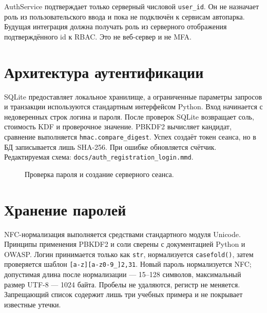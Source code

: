 \documentclass[12pt,a4paper]{article}
\begin{document}
AuthService подтверждает только серверный числовой \texttt{user\_id}. Он не назначает роль из пользовательского ввода и пока не подключён к сервисам автопарка. Будущая интеграция должна получать роль из серверного отображения подтверждённого id к RBAC. Это не веб-сервер и не MFA.

\section{Архитектура аутентификации}
SQLite предоставляет локальное хранилище, а ограниченные параметры запросов и транзакции используются стандартным интерфейсом Python. \cite{sqlite}
Вход начинается с недоверенных строк логина и пароля. После проверок SQLite возвращает соль, стоимость KDF и проверочное значение. PBKDF2 вычисляет кандидат, сравнение выполняется \texttt{hmac.compare\_digest}. Успех создаёт токен сеанса, но в БД записывается лишь SHA-256. При ошибке обновляется счётчик. Редактируемая схема: \texttt{docs/auth\_registration\_login.mmd}.

\begin{figure}[H]\centering
{}
\caption{Проверка пароля и создание серверного сеанса.}
\end{figure}

\section{Хранение паролей}
NFC-нормализация выполняется средствами стандартного модуля Unicode. \cite{unicode}
Принципы применения PBKDF2 и соли сверены с документацией Python и OWASP. \cite{hashlib,owasp-password}
Логин принимается только как \texttt{str}, нормализуется \texttt{casefold()}, затем проверяется шаблон \texttt{[a-z][a-z0-9\_]{2,31}}. Новый пароль нормализуется NFC; допустимая длина после нормализации — 15–128 символов, максимальный размер UTF-8 — 1024 байта. Пробелы не удаляются, регистр не меняется. Запрещающий список содержит лишь три учебных примера и не покрывает известные утечки.
\end{document}
